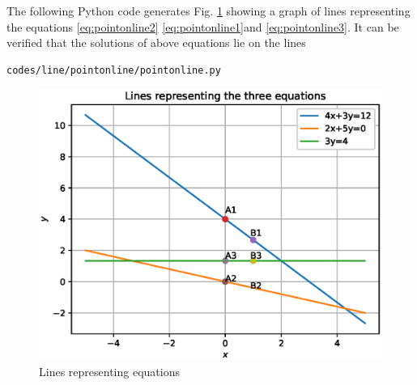 \begin{enumerate}[label=\thesection.\arabic*.,ref=\thesection.\theenumi]
The following Python code generates Fig. \ref{fig:point_on_line} showing a graph of lines representing the equations \ref{eq:pointonline2} \ref{eq:pointonline1}and \ref{eq:pointonline3}. It can be verified that the solutions of above equations lie on the lines
%
\begin{lstlisting}
codes/line/pointonline/pointonline.py
\end{lstlisting}
\begin{figure}[!ht]
\centering
\includegraphics[width=\columnwidth]{./codes/line/pointonline/pyfigs/pointonline.eps}
\caption{Lines representing equations}
\label{fig:point_on_line}
\end{figure}
\end{enumerate}
